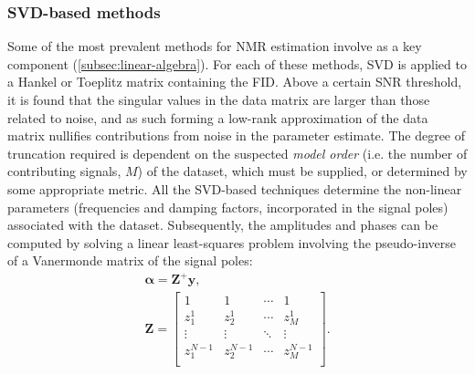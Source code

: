\subsubsection{\acs{SVD}-based methods}
Some of the most prevalent methods for \ac{NMR} estimation involve 
as a key component (\cref{subsec:linear-algebra}). For each of these methods,
\ac{SVD} is applied to a Hankel or Toeplitz matrix containing the \ac{FID}.
Above a certain \ac{SNR} threshold, it is found that the singular values in the
data matrix are larger than those related to noise, and
as such forming a low-rank approximation of the data matrix nullifies
contributions from noise in the parameter estimate. The degree of truncation
required is dependent on the suspected \emph{model order} (i.e. the number of
contributing signals, $M$) of the dataset, which must
be supplied, or determined by some appropriate metric. All the \ac{SVD}-based
techniques determine the non-linear parameters (frequencies and
damping factors, incorporated in the signal poles) associated with the dataset.
Subsequently, the amplitudes and phases can be computed by solving a linear
least-squares problem involving the pseudo-inverse of a Vanermonde matrix of
the signal poles:
\begin{subequations}
    \begin{gather}
        \symbf{\alpha} = \symbf{Z}^+ \symbf{y},\\
        \symbf{Z} = \begin{bmatrix}
            1 & 1 & \cdots & 1 \\
            z_1^1 & z_2^1 & \cdots & z_M^1\\
            \vdots & \vdots & \ddots & \vdots\\
            z_1^{N-1} & z_2^{N-1} & \cdots & z_M^{N-1}\\
            \end{bmatrix}.
    \end{gather}
    \label{eq:complex-amplitudes}
\end{subequations}


